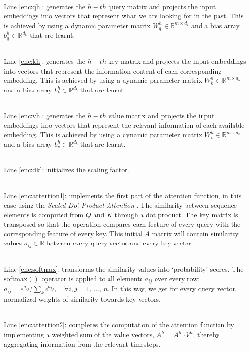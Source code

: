 \documentclass[algorithms,article,submit,pdftex,moreauthors]{Definitions/mdpi}
\begin{document}
~\\Line \ref{enc:qh}: generates the $h-th$ query matrix and projects the input embeddings into vectors that represent what we are looking for in the past. This is achieved by using a dynamic parameter matrix $W^h_q \in \mathbb{R}^{m \times d_k}$ and a bias array $b^h_q \in \mathbb{R}^{d_k}$ that are learnt.

~\\Line \ref{enc:kh}: generates the $h-th$ key matrix and projects the input embeddings into vectors that represent the information content of each corresponding embedding. This is achieved by using a dynamic parameter matrix $W^h_k \in \mathbb{R}^{m \times d_k}$ and a bias array $b^h_k \in \mathbb{R}^{d_k}$ that are learnt.

~\\Line \ref{enc:vh}: generates the $h-th$ value matrix and projects the input embeddings into vectors that represent the relevant information of each available embedding. This is achieved by using a dynamic parameter matrix $W^h_v \in \mathbb{R}^{m \times d_v}$ and a bias array $b^h_v \in \mathbb{R}^{d_k}$ that are learnt.

~\\Line \ref{enc:dk}: initializes the scaling factor.

~\\Line \ref{enc:attention1}: implements the first part of the attention function, in this case using the \textit{Scaled Dot-Product Attention} \cite{VSPU17}. The similarity between sequence elements is computed from $Q$ and $K$ through a dot product. The key matrix is transposed so that the operation compares each feature of every query with the corresponding feature of every key. This initial $A$ matrix will contain similarity values $a_{ij} \in \mathbb{R}$ between every query vector and every key vector. 

~\\Line \ref{enc:softmax}: transforms the similarity values into `probability' scores. The $\text{softmax}()$ operator is applied to all elements $a_{ij}$ over every row: $a_{ij} = e^{a_{ij}} / \sum_k e^{a_{kj}},\quad \forall i,j  = 1,\,...,\,n $. In this way, we get for every query vector, normalized weights of similarity towards key vectors. 

~\\Line \ref{enc:attention2}: completes the computation of the attention function by implementing a weighted sum of the value vectors, $A^h = A^h \cdot V^h$, thereby aggregating information from the relevant timesteps.
\end{document}

